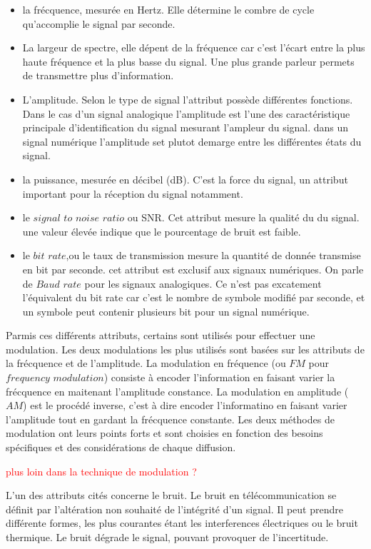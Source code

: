 \documentclass[12pt,a4paper,oneside, titlepage]{report}
\begin{document}
\begin{itemize}

\item la frécquence, mesurée en Hertz. Elle détermine le combre de cycle qu'accomplie le signal par seconde.
\item La largeur de spectre, elle dépent de la fréquence car c'est l'écart entre la plus haute fréquence et la plus basse du signal. Une plus grande parleur permets de transmettre plus d'information.
\item L'amplitude. Selon le type de signal l'attribut possède différentes fonctions. Dans le cas d'un signal analogique l'amplitude est l'une des caractéristique principale d'identification du signal mesurant l'ampleur du signal. dans un signal numérique l'amplitude set plutot demarge entre les différentes états du signal. 
\item la puissance, mesurée en décibel (dB). C'est la force du signal, un attribut important pour la réception du signal notamment.
\item le $signal$ $to$ $noise$ $ratio$ ou SNR. Cet attribut mesure la qualité du du signal. une valeur élevée indique que le pourcentage de bruit est faible.
\item le $bit$ $rate$,ou le taux de transmission mesure la quantité de donnée transmise en bit par seconde. cet attribut est exclusif aux signaux numériques. On parle de $Baud$ $rate$ pour les signaux analogiques. Ce n'est pas excatement l'équivalent du bit rate car c'est le nombre de symbole modifié par seconde, et un symbole peut contenir plusieurs bit pour un signal numérique.

\end{itemize}

Parmis ces différents attributs, certains sont utilisés pour effectuer une modulation. Les deux modulations les plus utilisés sont basées sur les attributs de la frécquence et de l'amplitude. La modulation en fréquence (ou $FM$ pour $frequency$ $modulation$) consiste à encoder l'information en faisant varier la frécquence en maitenant l'amplitude constance. La modulation en amplitude ($AM$) est le procédé inverse, c'est à dire encoder l'informatino en faisant varier l'amplitude tout en gardant la frécquence constante. Les deux méthodes de modulation ont leurs points forts et sont choisies en fonction des besoins spécifiques et des considérations de chaque diffusion.

\textcolor{red}{plus loin dans la technique de modulation ?}

L'un des attributs cités concerne le bruit. Le bruit en télécommunication se définit par l'altération non souhaité de l'intégrité d'un signal. Il peut prendre différente formes, les plus courantes étant les interferences électriques ou le bruit thermique. Le bruit dégrade le signal, pouvant provoquer de l'incertitude. 
\end{document}
